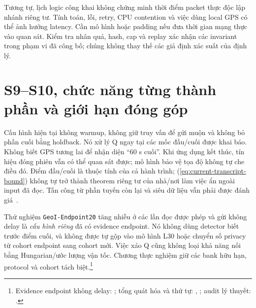 Tương tự, lịch logic công khai không chứng minh thời điểm packet thực độc lập nhánh riêng tư. Tính toán, lỗi, retry, CPU contention và việc dùng local GPS có thể ảnh hưởng latency. Cần mô hình hoặc padding nếu đưa thời gian mạng thực vào quan sát. Kiểm tra nhân quả, hash, cap và replay xác nhận các invariant trong phạm vi đã công bố; chúng không thay thế các giả định xác suất của định lý.

\section{S9--S10, chức năng từng thành phần và giới hạn đóng góp}
\label{sec:current-endpoints-contribution}

Cấu hình hiện tại không warmup, không giữ truy vấn để gửi muộn và không bỏ phần cuối bằng holdback. Nó xử lý Q ngay tại các mốc đầu/cuối được khai báo. Không biết GPS tương lai để nhận diện ``60 s cuối''. Khi ứng dụng kết thúc, tín hiệu đóng phiên vẫn có thể quan sát được; mô hình bảo vệ tọa độ không tự che điều đó. Điểm đầu/cuối là thuộc tính của cả hành trình; (\ref{eq:current-transcript-bound}) không tự trở thành theorem riêng tư của nhà/nơi làm việc ẩn ngoài input đã đọc. Tấn công từ phần tuyến còn lại và siêu dữ liệu vẫn phải được đánh giá~\cite{dhondt2022endpoint}.

Thử nghiệm \texttt{GeoI-Endpoint20} tăng nhiễu ở các lần đọc được phép và gửi không delay là \emph{cấu hình riêng} đã có evidence endpoint. Nó không dùng detector biết trước điểm cuối, và không được tự gộp vào mô hình L30 hoặc chuyển số privacy từ cohort endpoint sang cohort mới. Việc xáo Q cũng không loại khả năng nối bằng Hungarian/ước lượng vận tốc. Chương thực nghiệm giữ các bank hữu hạn, protocol và cohort tách biệt.\footnote{Evidence endpoint không delay: ; tổng quát hóa và thứ tự: , ; audit lý thuyết: .}

